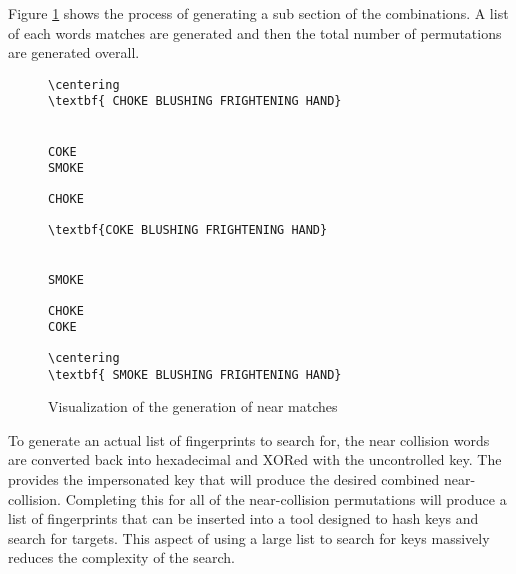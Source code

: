 Figure \ref{fig:nearMatch} shows the process of generating a sub section of the combinations. A list of each words matches are generated and then the total number of permutations are generated overall.

\begin{figure}[h!]
    \centering
    \begin{BVerbatim}[commandchars=\\\{\}]
        \centering
\textbf{ CHOKE BLUSHING FRIGHTENING HAND}
    \end{BVerbatim}
    \\
    \verb|COKE                           |
    \\
    \verb|SMOKE                          |
    \\
    \hspace{1cm}



    \verb|CHOKE                          |
    \\
    \begin{BVerbatim}[commandchars=\\\{\}]
\textbf{COKE BLUSHING FRIGHTENING HAND}
    \end{BVerbatim}
    \\
    \verb|SMOKE                          |
    \\
    \hspace{1cm}


    \verb|CHOKE                          |
    \\
    \verb|COKE                           |
    \\
    \begin{BVerbatim}[commandchars=\\\{\}]
        \centering
\textbf{ SMOKE BLUSHING FRIGHTENING HAND}
    \end{BVerbatim}
    \caption{Visualization of the generation of near matches}
    \label{fig:nearMatch}
\end{figure}

To generate an actual list of fingerprints to search for, the near collision words are converted back into hexadecimal and XORed with the uncontrolled key. The provides the impersonated key that will produce the desired combined near-collision. Completing this for all of the near-collision permutations will produce a list of fingerprints that can be inserted into a tool designed to hash keys and search for targets. This aspect of using a large list to search for keys massively reduces the complexity of the search.

